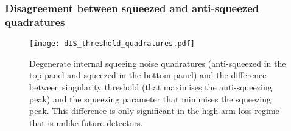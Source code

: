 \subsubsection{Disagreement between squeezed and anti-squeezed quadratures}

\begin{figure}
	\centering
	\texttt{[image: dIS\_threshold\_quadratures.pdf]}
	\caption{  Degenerate internal squeeing noise quadratures (anti-squeezed in the top panel and squeezed in the bottom panel) and the difference between singularity threshold (that maximises the anti-squeezing peak) and the squeezing parameter that minimises the squeezing peak. This difference is only significant in the high arm loss regime that is unlike  future detectors. }
	\label{fig:dIS_on_threshold}
\end{figure}

